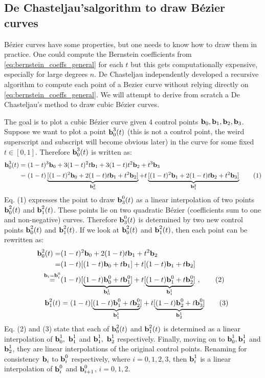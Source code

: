 \documentclass[a4paper]{article}
\begin{document}
\subsection{De Chasteljau'salgorithm to draw B\'ezier curves}
B\'ezier curves have some properties, but one needs to know how to draw them in practice. One could compute the Bernstein coefficients from \eqref{eq:bernstein_coeffs_general} for each $t$ but this gets computationally expensive, especially for large degrees $n$. De Chasteljau independently developed a recursive algorithm to compute each point of a Bezier curve without relying directly on \eqref{eq:bernstein_coeffs_general}. We will attempt to derive from scratch a De Chasteljau's method to draw cubic B\'ezier curves. 

The goal is to plot a cubic B\'ezier curve given 4 control points $\textbf{b}_0, \textbf{b}_1, \textbf{b}_2, \textbf{b}_3$. Suppose we want to plot a point $\textbf{b}_0^3(t)$ (this is not a control point, the weird superscript and subscript will become obvious later) in the curve for some fixed $t\in[0,1]$. Therefore $\textbf{b}_0^3(t)$ is written as:
\begin{align*}
    \textbf{b}_0^3(t) &= (1-t)^3\textbf{b}_0 + 3(1-t)^2t\textbf{b}_1 + 3(1-t)t^2\textbf{b}_2 + t^3\textbf{b}_3 \\
    &= (1-t)\underbrace{[(1-t)^2\textbf{b}_0 + 2(1-t)t\textbf{b}_1 + t^2\textbf{b}_2]}_{\textbf{b}_0^2} + t\underbrace{[(1-t)^2\textbf{b}_1 + 2(1-t)t\textbf{b}_2 + t^2\textbf{b}_3]}_{\textbf{b}_1^2}
    \tag{1}
\end{align*}
Eq. (1) expresses the point to draw $\textbf{b}_3^0(t)$ as a linear interpolation of two points $\textbf{b}_0^2(t)$ and $\textbf{b}_1^2(t)$. These points lie on two quadratic B\'ezier (coefficients sum to one and non-negative) curves. Therefore $\textbf{b}_3^0(t)$ is determined by two new control points $\textbf{b}_0^2(t)$ and $\textbf{b}_1^2(t)$. If we look at $\textbf{b}_0^2(t)$ and $\textbf{b}_1^2(t)$, then each point can be rewritten as:
\begin{align*}
    \textbf{b}_0^2(t) = & (1-t)^2\textbf{b}_0 + 2(1-t)t\textbf{b}_1 + t^2\textbf{b}_2 \\
    = & (1-t) [(1-t)\textbf{b}_0 + t\textbf{b}_1] + t [(1-t)\textbf{b}_1 + t\textbf{b}_2] \\
    \stackrel{\textbf{b}_i = \textbf{b}_i^0}= & (1-t) [\underbrace{(1-t)\textbf{b}_0^0 + t\textbf{b}_1^0}_{\textbf{b}_0^1}] + t [\underbrace{(1-t)\textbf{b}_1^0 + t\textbf{b}_2^0}_{\textbf{b}_1^1}]\ , \tag{2}\\
    \textbf{b}_1^2(t) &= (1-t) [\underbrace{(1-t)\textbf{b}_1^0 + t\textbf{b}_2^0}_{\textbf{b}_1^1}] + t [\underbrace{(1-t)\textbf{b}_2^0 + t\textbf{b}_3^0}_{\textbf{b}_2^1}] \tag{3}
\end{align*}
Eq. (2) and (3) state that each of $\textbf{b}_0^2(t)$ and $\textbf{b}_1^2(t)$ is determined as a linear interpolation of $\textbf{b}_0^1, \ \textbf{b}_1^1$ and $\textbf{b}_1^1, \ \textbf{b}_2^1$ respectively. Finally, moving on to $\textbf{b}_0^1, \textbf{b}_1^1$ and $\textbf{b}_2^1$, they are linear interpolations of the original control points. Renaming for consistency $\textbf{b}_i$ to $\textbf{b}_i^0$ respectively, where $i=0,1,2,3$, then $\textbf{b}_i^1$ is a linear interpolation of $\textbf{b}_i^0$ and $\textbf{b}_{i+1}^0$, $i=0,1,2$.
\end{document}
